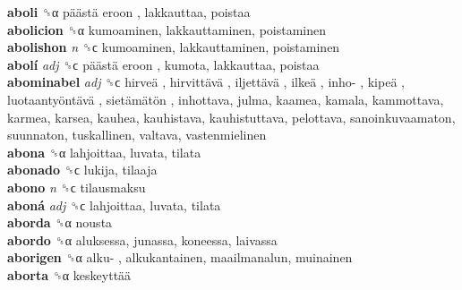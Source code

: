 \textbf{aboli} ␝α   päästä eroon , lakkauttaa, poistaa  \\
\textbf{abolicion} ␝α  kumoaminen, lakkauttaminen, poistaminen  \\
\textbf{abolishon} \emph{n}  ␝ϲ  kumoaminen, lakkauttaminen, poistaminen  \\
\textbf{abolí} \emph{adj}  ␝ϲ   päästä eroon , kumota, lakkauttaa, poistaa  \\
\textbf{abominabel} \emph{adj}  ␝ϲ   hirveä ,  hirvittävä ,  iljettävä ,  ilkeä ,  inho- ,  kipeä ,  luotaantyöntävä ,  sietämätön , inhottava, julma, kaamea, kamala, kammottava, karmea, karsea, kauhea, kauhistava, kauhistuttava, pelottava, sanoinkuvaamaton, suunnaton, tuskallinen, valtava, vastenmielinen  \\
\textbf{abona} ␝α  lahjoittaa, luvata, tilata  \\
\textbf{abonado} ␝ϲ  lukija, tilaaja  \\
\textbf{abono} \emph{n}  ␝ϲ  tilausmaksu  \\
\textbf{aboná} \emph{adj}  ␝ϲ  lahjoittaa, luvata, tilata  \\
\textbf{aborda} ␝α  nousta  \\
\textbf{abordo} ␝α  aluksessa, junassa, koneessa, laivassa  \\
\textbf{aborigen} ␝α   alku- , alkukantainen, maailmanalun, muinainen  \\
\textbf{aborta} ␝α   keskeyttää   \\
